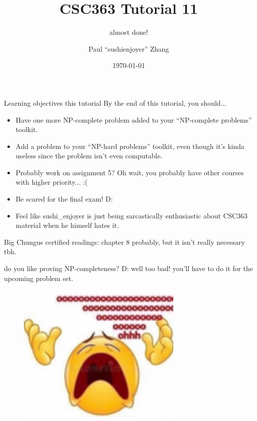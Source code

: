 \documentclass{beamer}
\title{CSC363 Tutorial 11}
\subtitle{almost done!}
\date{\today}
\author{Paul ``sushi{\textunderscore}enjoyer'' Zhang}
\institute{University of Chungi}
\begin{document}
\maketitle

\begin{frame}{Learning objectives this tutorial}
By the end of this tutorial, you should...
\begin{itemize}
\item Have one more NP-complete problem added to your ``NP-complete problems'' toolkit.
\item Add a problem to your ``NP-hard problems'' toolkit, even though it's kinda useless since the problem isn't even computable.
\item Probably work on assignment 5? Oh wait, you probably have other courses with higher priority... :(
\item Be scared for the final exam! D:
\item Feel like sushi\_enjoyer is just being sarcastically enthusiastic about CSC363 material when he himself hates it.
\end{itemize}

Big Chungus certified readings: chapter 8 probably, but it isn't really necessary tbh.
\end{frame}

\begin{frame}{do you like proving NP-completeness? D:}
well too bad! you'll have to do it for the upcoming problem set.

\begin{figure}[h]
\centering
\includegraphics[width=8cm]{img/oooooooooooooooooooooooooooooooooooooooooooooooooohhhhhh.png}
\end{figure}
\end{frame}
\end{document}
